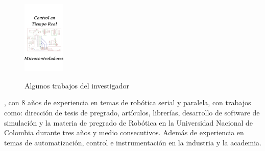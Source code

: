 \begin{itemize}
\begin{enumerate}[1)]
{\begin{figure}
{          \includegraphics[width=2.0cm]{../images/SomeThingsByMeSumary_4.png}
        }
        \caption{Algunos trabajos del investigador}
        \label{fig:MeThings}
      \end{figure}
    }{, con 8 a\~nos de experiencia en temas de rob\'otica serial y paralela, con trabajos como: direcci\'on de tesis de pregrado\cite{Cortes2009,Valencia2009,Barragan2009,Silva2009}, art\'iculos\cite{Castillo2007}, librer\'ias\cite{Castillo2008}, desarrollo de software de simulaci\'on\cite{Castillo2010} y la materia de pregrado de Rob\'otica en la Universidad Nacional de Colombia durante tres a\~nos y medio consecutivos. Adem\'as de experiencia en temas de automatizaci\'on, control e instrumentaci\'on en la industria y la academia.}%
  \end{enumerate}
\end{itemize}
